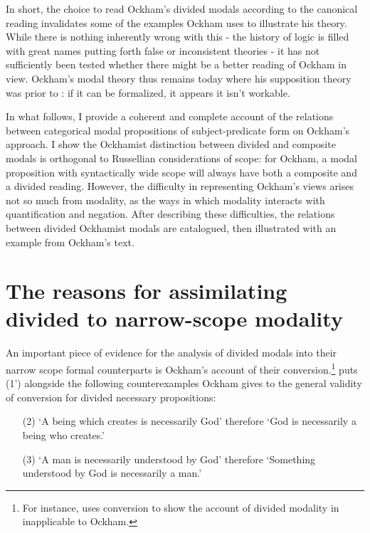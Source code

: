 	In short, the choice to read Ockham's divided modals according to the canonical reading invalidates some of the examples Ockham uses to illustrate his theory. While there is nothing inherently wrong with this - the history of logic is filled with great names putting forth false or inconsistent theories - it has not sufficiently been tested whether there might be a better reading of Ockham in view. Ockham's modal theory thus remains today where his supposition theory was prior to \cite{PriestRead1977}: if it can be formalized, it appears it isn't workable.
	
	In what follows, I provide a coherent and complete account of the relations between categorical modal propositions of subject-predicate form on Ockham's approach. I show the Ockhamist distinction between divided and composite modals is orthogonal to Russellian considerations of scope: for Ockham, a modal proposition with syntactically wide scope will always have both a composite and a divided reading. However, the difficulty in representing Ockham's views arises not so much from modality, as the ways in which modality interacts with quantification and negation. After describing these difficulties, the relations between divided Ockhamist modals are catalogued, then illustrated with an example from Ockham's text. 
	
	\section[The assimilation of divided to narrow-scope modality]{The reasons for assimilating divided to narrow-scope modality}
	An important piece of evidence for the analysis of divided modals into their narrow scope formal counterparts is Ockham's account of their conversion.\footnote{For instance, \cite[p. 276]{PriestRead1981} uses conversion to show the account of divided modality in \cite[sec. 12]{Moody1952} inapplicable to Ockham.} \cite[p. 242]{Johnston2015} puts (1') alongside the following counterexamples Ockham gives to the general validity of conversion for divided necessary propositions:
	\begin{enumerate}
		\item[(2)]	`A being which creates is necessarily God' therefore `God is necessarily a being who creates.' 
		\item[(3)]	`A man is necessarily understood by God' therefore `Something understood by God is necessarily a man.' \cite[II. 24, p. 329]{OckhamSL}
	\end{enumerate}
	
